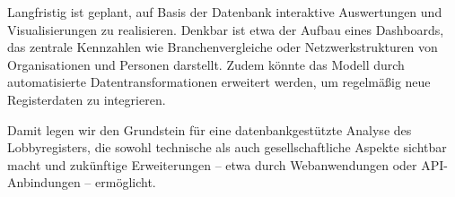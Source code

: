 \documentclass[12pt,twoside=false,a4paper,parskip]{scrbook}
\begin{document}
Langfristig ist geplant, auf Basis der Datenbank interaktive Auswertungen und Visualisierungen zu realisieren. Denkbar ist etwa der Aufbau eines Dashboards, das zentrale Kennzahlen wie Branchenvergleiche oder Netzwerkstrukturen von Organisationen und Personen darstellt. Zudem könnte das Modell durch automatisierte Datentransformationen erweitert werden, um regelmäßig neue Registerdaten zu integrieren.

Damit legen wir den Grundstein für eine datenbankgestützte Analyse des Lobbyregisters, die sowohl technische als auch gesellschaftliche Aspekte sichtbar macht und zukünftige Erweiterungen – etwa durch Webanwendungen oder API-Anbindungen – ermöglicht.


\backmatter
\end{document}
